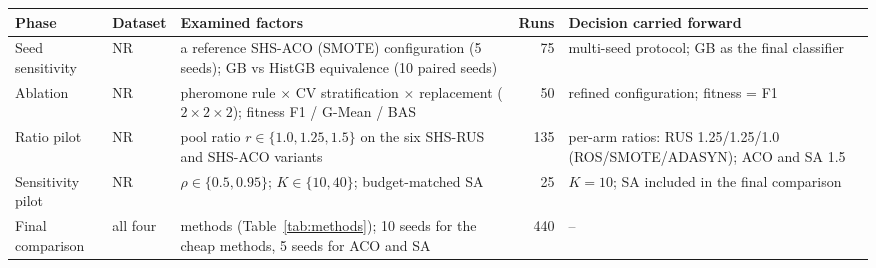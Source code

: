 \begin{tabular}{>{\raggedright\arraybackslash}p{23mm}>{\raggedright\arraybackslash}p{12mm}>{\raggedright\arraybackslash}p{52mm}r>{\raggedright\arraybackslash}p{40mm}}
\toprule
Phase & Dataset & Examined factors & Runs & Decision carried forward \\
\midrule
Seed sensitivity & NR &
  a reference SHS-ACO (SMOTE) configuration (5 seeds); GB vs HistGB
  equivalence (10 paired seeds) & 75 &
  multi-seed protocol; GB as the final classifier \\
\addlinespace[2pt]
Ablation & NR &
  pheromone rule $\times$ CV stratification $\times$ replacement
  ($2\times2\times2$); fitness F1 / G-Mean / BAS & 50 &
  refined configuration; fitness = F1 \\
\addlinespace[2pt]
Ratio pilot & NR &
  pool ratio $r \in \{1.0, 1.25, 1.5\}$ on the six SHS-RUS and SHS-ACO
  variants & 135 &
  per-arm ratios: RUS 1.25/1.25/1.0 (ROS/SMOTE/ADASYN); ACO and SA 1.5 \\
\addlinespace[2pt]
Sensitivity pilot & NR &
  $\rho \in \{0.5, 0.95\}$; $K \in \{10, 40\}$; budget-matched SA & 25 &
  $K = 10$; SA included in the final comparison \\
\addlinespace[2pt]
Final comparison & all four &
  13 methods (Table~\ref{tab:methods}); 10 seeds for the cheap methods,
  5 seeds for ACO and SA & 440 & -- \\
\bottomrule
\end{tabular}
